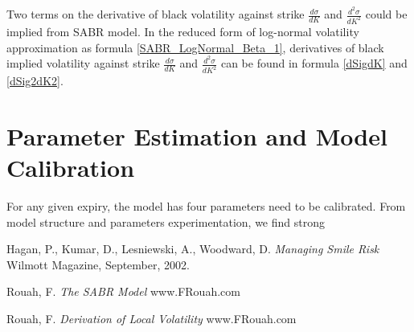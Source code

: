 \documentclass{article}
\begin{document}
Two terms on the derivative of black volatility against strike $ \frac{d \sigma}{d K} $ and $ \frac{d^2 \sigma}{d K^2} $ could be implied from SABR model.
In the reduced form of log-normal volatility approximation as formula \ref{SABR_LogNormal_Beta_1}, derivatives of black implied volatility against strike $ \frac{d \sigma}{d K} $ and $ \frac{d^2 \sigma}{d K^2} $ can be found in formula \ref{dSigdK} and \ref{dSig2dK2}.


\section{Parameter Estimation and Model Calibration}

For any given expiry, the model has four parameters need to be calibrated.
From model structure and parameters experimentation, we find strong


\begin{thebibliography}{9}
    Hagan, P., Kumar, D., Lesniewski, A., Woodward, D.
    \textit{Managing Smile Risk}
    Wilmott Magazine, September, 2002.
    
    Rouah, F.
    \textit{The SABR Model}
    www.FRouah.com
    
    Rouah, F.
    \textit{Derivation of Local Volatility}
    www.FRouah.com
\end{thebibliography}
\end{document}
